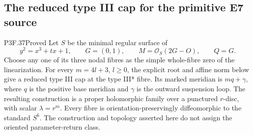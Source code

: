 \subsection{The reduced type III cap for the primitive E7 source}

\begin{statement}{P3F.37}{Proved}
Let $S$ be the minimal regular surface of
\[
 y^2=x^3+tx+1,\qquad G=(0,1),\qquad
 M=\mathcal O_S(2G-O),\qquad Q=G.
\]
Choose any one of its three nodal fibres as the simple whole-fibre
zero of the linearization. For every $m=4l+3$, $l\ge0$, the
explicit root and affine norm below give a reduced type III cap
at the type III* fibre. Its marked meridian is
$m q+\gamma$, where $q$ is the positive base meridian and
$\gamma$ is the outward suspension loop.
The resulting construction is a proper holomorphic family over a
punctured $r$-disc, with scalar $\lambda=r^m$. Every fibre is
orientation-preservingly diffeomorphic to the standard $S^6$.
The construction and topology asserted here do not assign the
oriented parameter-return class.
\end{statement}
